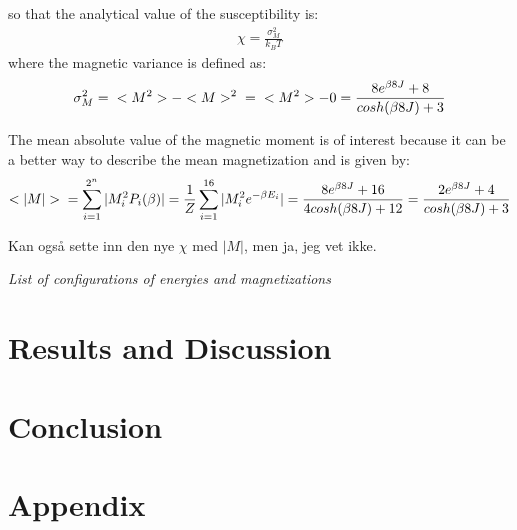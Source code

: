\documentclass[12pt,english,a4paper]{article}
\begin{document}
so that the analytical value of the susceptibility is:
\begin{align*}
    \chi = \frac{\sigma_M^2}{k_BT}
\end{align*}
where the magnetic variance is defined as:
\begin{align*}
    \sigma_M^2 = \hspace{0.2cm} <M^2> - <M>^2 \hspace{0.2cm}
               = \hspace{0.2cm} <M^2> - 0
               = \frac{8e^{\beta 8J} + 8}{cosh(\beta 8J) + 3}
\end{align*}

The mean absolute value of the magnetic moment is of interest because it can be a better way to describe the mean magnetization and is given by:
\begin{align*}
    <|M|> \hspace{0.2cm} 
          = \sum_{i=1}^{2^n} |M_i^2P_i(\beta)| 
          = \frac{1}{Z} \sum_{i=1}^{16} |M_i^2e^{-\beta E_i}|
          = \frac{8e^{\beta 8J} + 16}{4cosh(\beta 8J) + 12}
          = \frac{2e^{\beta 8J} + 4}{cosh(\beta 8J) + 3}
\end{align*}

Kan også sette inn den nye $\chi$ med $|M|$, men ja, jeg vet ikke.




\vfill


\begin{table}[h]
    \centering
    
    \caption{\textit{List of configurations of energies and magnetizations}}
    \label{tab:E_M_Configurations}
\end{table}



\section{Results and Discussion}

\section{Conclusion}

\section{Appendix}
\end{document}
